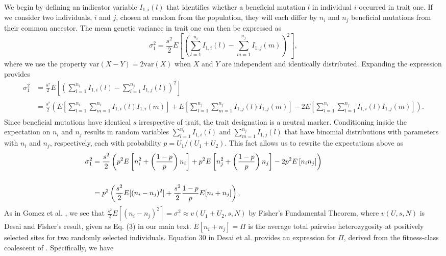 \documentclass[11pt,onecolumn]{article}
\begin{document}
{We begin by defining an indicator variable $I_{1,i}(l)$ that identifies whether a beneficial mutation $l$ in individual $i$ occurred in trait one. If we consider two individuals, $i$ and $j$, chosen at random from the population, they will each differ by $n_i$ and $n_j$ beneficial mutations from their common ancestor. The mean genetic variance in trait one can then be expressed as
\[
\sigma_1^2 = \frac{s^2}{2}E\left[\left(\sum_{l=1}^{n_i}I_{1,i}(l) - \sum_{m=1}^{n_j}I_{1,j}(m) \right)^2\right],
\]
where we use the property $\text{var}(X-Y)=2\text{var}(X)$ when $X$ and $Y$ are independent and identically distributed. Expanding the expression provides
\[
\begin{aligned}
\sigma_1^2 &=\frac{s^2}{2}E\left[\left(\sum_{l=1}^{n_i} I_{1,i}(l) - \sum_{l=1}^{n_j} I_{1,j}(l)\right)^2 \right] \\
\\
&=\frac{s^2}{2} \left( E\left[ \sum_{l=1}^{n_i} \sum_{m=1}^{n_i} I_{1,i}(l)I_{1,i}(m)\right]+E\left[\sum_{l=1}^{n_j} \sum_{m=1}^{n_j} I_{1,j}(l)I_{1,j}(m) \right] - 2 E\left[\sum_{l=1}^{n_i} \sum_{l=1}^{n_j} I_{1,i}(l) I_{1,j}(m)\right] \right). \\
&
\end{aligned}
\]
Since beneficial mutations have identical $s$ irrespective of trait, the trait designation is a neutral marker. Conditioning inside the expectation on $n_i$ and $n_j$ results in random variables $\sum_{l=1}^{n_i}I_{1,i}(l)$ and $\sum_{m=1}^{n_j}I_{1,j}(l)$ that have binomial distributions with parameters with $n_i$ and $n_j$, respectively, each with probability $p = U_1/(U_1+U_2)$. This fact allows us to rewrite the expectations above as
\[
\begin{aligned}
\sigma_1^2 &= \frac{s^2}{2}\left( p^2 E\left[ n_i^2+\left(\frac{1-p}{p}\right)n_i\right]+ p^2 E\left[n_j^2+\left(\frac{1-p}{p}\right)n_j \right] - 2 p^2 E\left[ n_i n_j \right] \right) \hspace{0.63in} \\
\\
&=p^2 \left(\frac{s^2}{2} E[(n_i-n_j)^2] + \frac{s^2}{2}\frac{1-p}{p}E[n_i+n_j] \right), &
\end{aligned}
\]
As in Gomez et al. \cite{gomez2019directional}, we see that $\frac{s^2}{2} E[(n_i-n_j)^2] = \sigma^2 \approx v(U_1+U_2,s,N)$ by Fisher's Fundamental Theorem, where $v(U,s,N)$ is Desai and Fisher's \citep{desai2007beneficial} result, given as Eq. (3) in our main text. $E[n_i+n_j]=\Pi$ is the average total pairwise heterozygosity at positively selected sites for two randomly selected individuals. Equation 30 in Desai et al. \cite{Desai2013} provides an expression for $\Pi$, derived from the fitness-class coalescent of \cite{Walczak753}. Specifically, we have 
}
\end{document}
